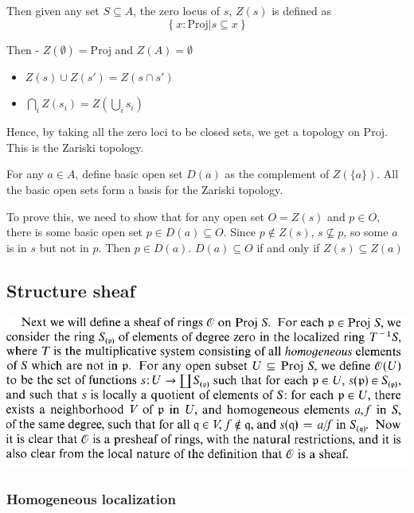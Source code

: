 \documentclass[11pt]{article}
\providecommand{\tightlist}{%
      \setlength{\itemsep}{0pt}\setlength{\parskip}{0pt}}
\begin{document}
    Then given any set \(S\subseteq A\), the zero locus of \(s\), \(Z(s)\)
is defined as \[
\left\{x : \mathrm{Proj}| s\subseteq x\right\}
\]

    Then - \(Z(\emptyset)=\mathrm{Proj}\) and \(Z(A)=\emptyset\)

    \begin{itemize}
\tightlist
\item
  \(Z(s)\cup Z(s') = Z(s\cap s')\)
\end{itemize}

    \begin{itemize}
\tightlist
\item
  \(\bigcap_{i} Z(s_i)= Z\left(\bigcup_{i}s_i\right)\)
\end{itemize}

    Hence, by taking all the zero loci to be closed sets, we get a topology
on \(\mathrm{Proj}\). This is the Zariski topology.

    For any \(a\in A\), define basic open set \(D(a)\) as the complement of
\(Z(\{a\})\). All the basic open sets form a basis for the Zariski
topology.

    To prove this, we need to show that for any open set \(O=Z(s)\) and
\(p\in O\), there is some basic open set \(p\in D(a)\subseteq O\). Since
\(p\not\in Z(s)\), \(s\not\subseteq p\), so some \(a\) is in \(s\) but
not in \(p\). Then \(p\in D(a)\). \(D(a)\subseteq O\) if and only if
\(Z(s)\subseteq Z({a})\)

    \hypertarget{structure-sheaf}{%
\subsection{Structure sheaf}\label{structure-sheaf}}

\includegraphics{img/structure_sheaf.png}

    \hypertarget{homogeneous-localization}{%
\subsubsection{Homogeneous
localization}\label{homogeneous-localization}}
\end{document}
